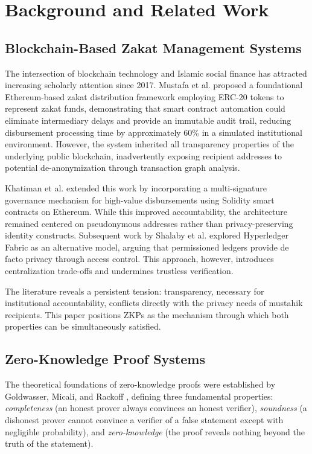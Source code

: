 \documentclass[conference]{IEEEtran}
\begin{document}
\section{Background and Related Work}

\subsection{Blockchain-Based Zakat Management Systems}

The intersection of blockchain technology and Islamic social finance has attracted increasing scholarly attention since 2017. Mustafa et al. \cite{mustafa2021} proposed a foundational Ethereum-based zakat distribution framework employing ERC-20 tokens to represent zakat funds, demonstrating that smart contract automation could eliminate intermediary delays and provide an immutable audit trail, reducing disbursement processing time by approximately 60\% in a simulated institutional environment. However, the system inherited all transparency properties of the underlying public blockchain, inadvertently exposing recipient addresses to potential de-anonymization through transaction graph analysis.

Khatiman et al. \cite{khatiman2021} extended this work by incorporating a multi-signature governance mechanism for high-value disbursements using Solidity smart contracts on Ethereum. While this improved accountability, the architecture remained centered on pseudonymous addresses rather than privacy-preserving identity constructs. Subsequent work by Shalaby et al. \cite{shalaby2023} explored Hyperledger Fabric as an alternative model, arguing that permissioned ledgers provide de facto privacy through access control. This approach, however, introduces centralization trade-offs and undermines trustless verification.

The literature reveals a persistent tension: transparency, necessary for institutional accountability, conflicts directly with the privacy needs of mustahik recipients. This paper positions ZKPs as the mechanism through which both properties can be simultaneously satisfied.

\subsection{Zero-Knowledge Proof Systems}

The theoretical foundations of zero-knowledge proofs were established by Goldwasser, Micali, and Rackoff \cite{goldwasser1985}, defining three fundamental properties: \textit{completeness} (an honest prover always convinces an honest verifier), \textit{soundness} (a dishonest prover cannot convince a verifier of a false statement except with negligible probability), and \textit{zero-knowledge} (the proof reveals nothing beyond the truth of the statement).
\end{document}
